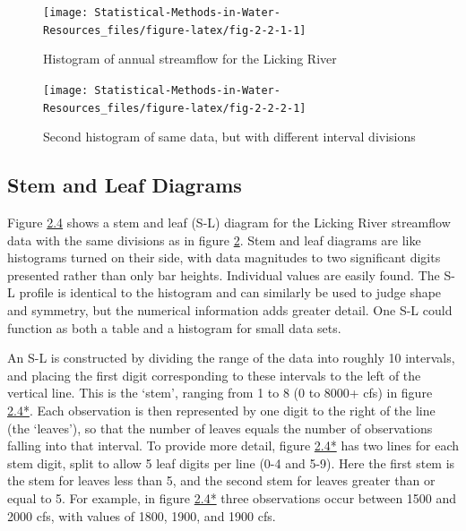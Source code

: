 \documentclass[]{book}
\begin{document}
\begin{figure}

{\centering \texttt{[image: Statistical-Methods-in-Water-Resources\_files/figure-latex/fig-2-2-1-1]} 

}

\caption{Histogram of annual streamflow for the Licking River}\label{fig:fig-2-2-1}
\end{figure}
\begin{figure}

{\centering \texttt{[image: Statistical-Methods-in-Water-Resources\_files/figure-latex/fig-2-2-2-1]} 

}

\caption{Second histogram of same data, but with different interval divisions}\label{fig:fig-2-2-2}
\end{figure}

\hypertarget{stem-and-leaf-diagrams}{%
\subsection{Stem and Leaf Diagrams}\label{stem-and-leaf-diagrams}}

Figure \protect\hyperlink{fig-2-3}{2.4} shows a stem and leaf (S-L) diagram for the Licking River streamflow data with the same divisions as in figure \ref{fig:fig-2-2-2}. Stem and leaf diagrams are like histograms turned on their side, with data magnitudes to two significant digits presented rather than only bar heights. Individual values are easily found. The S-L profile is identical to the histogram and can similarly be used to judge shape and symmetry, but the numerical information adds greater detail. One S-L could function as both a table and a histogram for small data sets.

An S-L is constructed by dividing the range of the data into roughly 10 intervals, and placing the first digit corresponding to these intervals to the left of the vertical line. This is the `stem', ranging from 1 to 8 (0 to 8000+ cfs) in figure \protect\hyperlink{fig-2-3}{2.4*}. Each observation is then represented by one digit to the right of the line (the `leaves'), so that the number of leaves equals the number of observations falling into that interval. To provide more detail, figure \protect\hyperlink{fig-2-3}{2.4*} has two lines for each stem digit, split to allow 5 leaf digits per line (0-4 and 5-9). Here the first stem is the stem for leaves less than 5, and the second stem for leaves greater than or equal to 5. For example, in figure \protect\hyperlink{fig-2-3}{2.4*} three observations occur between 1500 and 2000 cfs, with values of 1800, 1900, and 1900 cfs.
\end{document}
